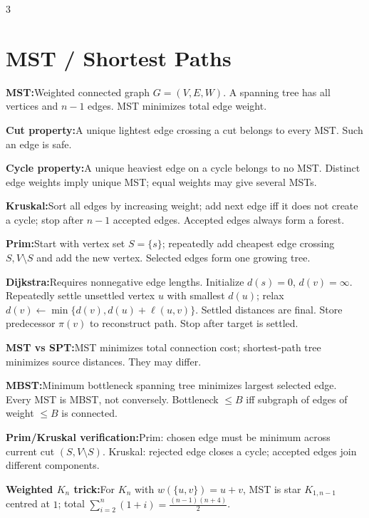 \documentclass[10pt]{article}
\newenvironment{cheatitems}{\par\vspace{-1pt}}{\par\vspace{-1pt}}
\newcommand{\cheatrow}[2]{\par\noindent\textbf{#1:}\enspace #2\par}
\begin{document}
\begin{multicols}{3}
\section*{MST / Shortest Paths}
\begin{cheatitems}
\cheatrow{MST}{Weighted connected graph $G=(V,E,W)$. A spanning tree has all vertices and $n-1$ edges. MST minimizes total edge weight.}
\cheatrow{Cut property}{A unique lightest edge crossing a cut belongs to every MST. Such an edge is safe.}
\cheatrow{Cycle property}{A unique heaviest edge on a cycle belongs to no MST. Distinct edge weights imply unique MST; equal weights may give several MSTs.}
\cheatrow{Kruskal}{Sort all edges by increasing weight; add next edge iff it does not create a cycle; stop after $n-1$ accepted edges. Accepted edges always form a forest.}
\cheatrow{Prim}{Start with vertex set $S=\{s\}$; repeatedly add cheapest edge crossing $S,V\setminus S$ and add the new vertex. Selected edges form one growing tree.}
\cheatrow{Dijkstra}{Requires nonnegative edge lengths. Initialize $d(s)=0$, $d(v)=\infty$. Repeatedly settle unsettled vertex $u$ with smallest $d(u)$; relax $d(v)\leftarrow\min\{d(v),d(u)+\ell(u,v)\}$. Settled distances are final. Store predecessor $\pi(v)$ to reconstruct path. Stop after target is settled.}
\cheatrow{MST vs SPT}{MST minimizes total connection cost; shortest-path tree minimizes source distances. They may differ.}
\cheatrow{MBST}{Minimum bottleneck spanning tree minimizes largest selected edge. Every MST is MBST, not conversely. Bottleneck $\le B$ iff subgraph of edges of weight $\le B$ is connected.}
\cheatrow{Prim/Kruskal verification}{Prim: chosen edge must be minimum across current cut $(S,V\setminus S)$. Kruskal: rejected edge closes a cycle; accepted edges join different components.}
\cheatrow{Weighted $K_n$ trick}{For $K_n$ with $w(\{u,v\})=u+v$, MST is star $K_{1,n-1}$ centred at $1$; total $\sum_{i=2}^n(1+i)=\frac{(n-1)(n+4)}2$.}
\end{cheatitems}




\end{multicols}
\end{document}
